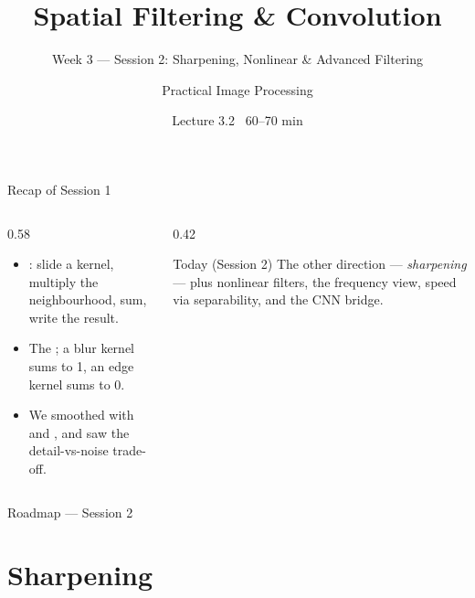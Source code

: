 \documentclass[10pt,aspectratio=169]{beamer}
\title{Spatial Filtering \& Convolution}
\subtitle{Week 3 — Session 2: Sharpening, Nonlinear \& Advanced Filtering}
\author{Practical Image Processing}
\date{Lecture 3.2 \textbullet\ 60--70 min}
\begin{document}
\maketitle

\begin{frame}{Recap of Session 1}
  \begin{columns}[T]
    \begin{column}{0.58\textwidth}
      \begin{itemize}
        \item {}: slide a kernel, multiply the neighbourhood, sum, write the result.
        \item The ; a blur kernel sums to 1, an edge kernel sums to 0.
        \item We smoothed with  and , and saw the detail-vs-noise trade-off.
      \end{itemize}
    \end{column}
    \begin{column}{0.42\textwidth}
      \begin{alertblock}{Today (Session 2)}
        The other direction — \emph{sharpening} — plus nonlinear filters, the frequency view,
        speed via separability, and the CNN bridge.
      \end{alertblock}
    \end{column}
  \end{columns}
\end{frame}

\begin{frame}{Roadmap — Session 2}\tableofcontents\end{frame}

\section{Sharpening}
\end{document}

